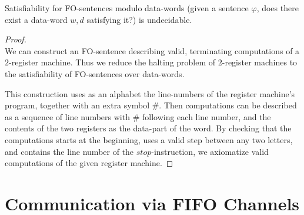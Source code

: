 \documentclass[english]{panikzettel}
\begin{document}
Satisfiability for FO-sentences modulo data-words (given a sentence $\varphi$, does there exist a data-word $w,d$ satisfying it?) is undecidable.
\begin{proof} \ \\
    We can construct an FO-sentence describing valid, terminating computations of a $2$-register machine. Thus we reduce the halting problem of $2$-register machines to the satisfiability of FO-sentences over data-words.

    This construction uses as an alphabet the line-numbers of the register machine's program, together with an extra symbol $\#$. Then computations can be described as a sequence of line numbers with $\#$ following each line number, and the contents of the two registers as the data-part of the word.
    By checking that the computations starts at the beginning, uses a valid step between any two letters, and contains the line number of the $stop$-instruction, we axiomatize valid computations of the given register machine.
\end{proof}

\section{Communication via FIFO Channels}
\end{document}
